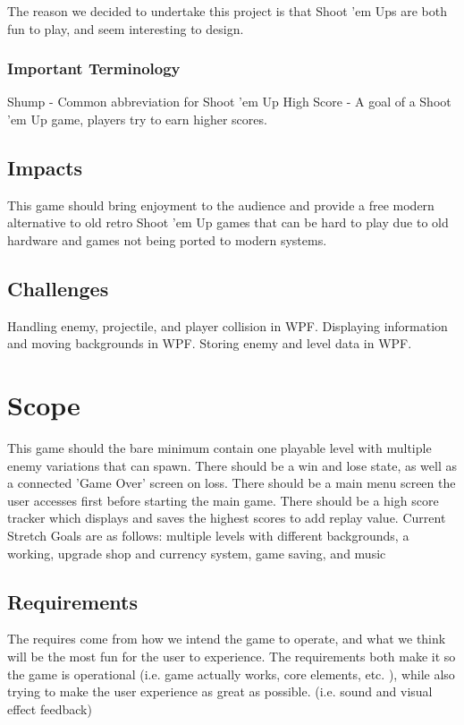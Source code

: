 \documentclass[10pt,conference,onecolumn,compsoc]{IEEEtran}
\begin{document}
The reason we decided to undertake this project is that Shoot 'em Ups are both fun to play, and seem interesting to design.

\subsubsection{Important Terminology}
Shump - Common abbreviation for Shoot 'em Up
High Score - A goal of a Shoot 'em Up game, players try to earn higher scores.

\subsection{Impacts}
This game should bring enjoyment to the audience and provide a free modern alternative to old retro Shoot 'em Up games that can be hard to play due to old hardware and games not being ported to modern systems.

\subsection{Challenges}
Handling enemy, projectile, and player collision in WPF.
Displaying information and moving backgrounds in WPF.
Storing enemy and level data in WPF.


\section{Scope}
This game should the bare minimum contain one playable level with multiple enemy variations that can spawn. There should be a win and lose state, as well as a connected 'Game Over' screen on loss. There should be a main menu screen the user accesses first before starting the main game. There should be a high score tracker which displays and saves the highest scores to add replay value. Current Stretch Goals are as follows: multiple levels with different backgrounds, a working, upgrade shop and currency system, game saving, and music

\subsection{Requirements}
The requires come from how we intend the game to operate, and what we think will be the most fun for the user to experience. The requirements both make it so the game is operational (i.e. game actually works, core elements, etc. ), while also trying to make the user experience as great as possible. (i.e. sound and visual effect feedback)
\end{document}
